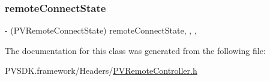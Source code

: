 \subsubsection{\texorpdfstring{remote\+Connect\+State}{remoteConnectState}}
{\footnotesize\ttfamily -\/ (P\+V\+Remote\+Connect\+State) remote\+Connect\+State\hspace{0.3cm}{\ttfamily [read]}, {\ttfamily [write]}, {\ttfamily [nonatomic]}, {\ttfamily [assign]}}



The documentation for this class was generated from the following file\+:\begin{DoxyCompactItemize}
\item 
P\+V\+S\+D\+K.\+framework/\+Headers/\hyperlink{_p_v_remote_controller_8h}{P\+V\+Remote\+Controller.\+h}\end{DoxyCompactItemize}
